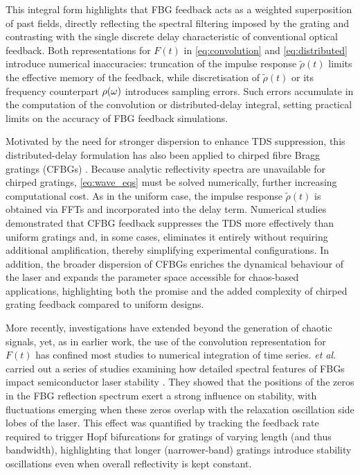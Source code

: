 %
This integral form highlights that FBG feedback acts as a weighted superposition of past fields, directly reflecting the spectral filtering imposed by the grating and contrasting with the single discrete delay characteristic of conventional optical feedback.
Both representations for $F(t)$ in \eqref{eq:convolution} and \eqref{eq:distributed} introduce numerical inaccuracies: truncation of the impulse response $\tilde{\rho}(t)$ limits the effective memory of the feedback, while discretisation of $\tilde{\rho}(t)$ or its frequency counterpart $\rho(\omega)$ introduces sampling errors.
Such errors accumulate in the computation of the convolution or distributed-delay integral, setting practical limits on the accuracy of FBG feedback simulations.
%
\par
%
Motivated by the need for stronger dispersion to enhance TDS suppression, this distributed-delay formulation has also been applied to chirped fibre Bragg gratings (CFBGs) \cite{wang2017time, wang2019key, wang2023critical, chao2020permutation}.
Because analytic reflectivity spectra are unavailable for chirped gratings, \eqref{eq:wave_eqs} must be solved numerically, further increasing computational cost.
As in the uniform case, the impulse response $\tilde{\rho}(t)$ is obtained via FFTs and incorporated into the delay term.
Numerical studies demonstrated that CFBG feedback suppresses the TDS more effectively than uniform gratings and, in some cases, eliminates it entirely without requiring additional amplification, thereby simplifying experimental configurations.
In addition, the broader dispersion of CFBGs enriches the dynamical behaviour of the laser and expands the parameter space accessible for chaos-based applications, highlighting both the promise and the added complexity of chirped grating feedback compared to uniform designs.
%
\par
%
More recently, investigations have extended beyond the generation of chaotic signals, yet, as in earlier work, the use of the convolution representation for $F(t)$ has confined most studies to numerical integration of time series.
\Skenderas \textit{et al.} carried out a series of studies examining how detailed spectral features of FBGs impact semiconductor laser stability \cite{skenderas2021feedback, skenderas2022influence, skenderas2024impact}.
They showed that the positions of the zeros in the FBG reflection spectrum exert a strong influence on stability, with fluctuations emerging when these zeros overlap with the relaxation oscillation side lobes of the laser.
This effect was quantified by tracking the feedback rate required to trigger Hopf bifurcations for gratings of varying length (and thus bandwidth), highlighting that longer (narrower-band) gratings introduce stability oscillations even when overall reflectivity is kept constant.
